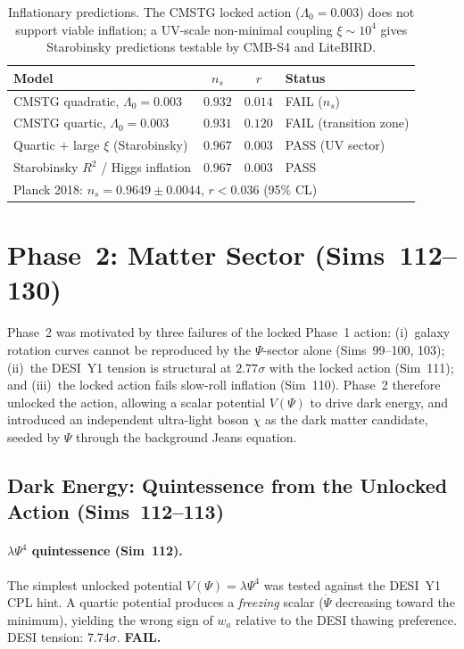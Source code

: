 \documentclass[12pt,a4paper]{article}
\begin{document}
\begin{table}[h]
\centering
\begin{tabular}{lccl}
\hline
Model & $n_s$ & $r$ & Status \\
\hline
CMSTG quadratic, $\Lambda_0=0.003$ & $0.932$ & $0.014$ & FAIL ($n_s$) \\
CMSTG quartic, $\Lambda_0=0.003$ & $0.931$ & $0.120$ & FAIL (transition zone) \\
Quartic $+$ large $\xi$ (Starobinsky) & $0.967$ & $0.003$ & PASS (UV sector) \\
Starobinsky $R^2$ / Higgs inflation & $0.967$ & $0.003$ & PASS \\
\hline
\multicolumn{4}{l}{Planck 2018: $n_s=0.9649\pm0.0044$, $r<0.036$ (95\% CL)} \\
\hline
\end{tabular}
\caption{Inflationary predictions. The CMSTG locked action ($\Lambda_0=0.003$)
does not support viable inflation; a UV-scale non-minimal coupling $\xi\sim10^4$
gives Starobinsky predictions testable by CMB-S4 and LiteBIRD.}
\label{tab:inflation}
\end{table}

\section{Phase~2: Matter Sector (Sims~112--130)}
\label{sec:phase2}

Phase~2 was motivated by three failures of the locked Phase~1 action:
(i)~galaxy rotation curves cannot be reproduced by the $\Psi$-sector alone
(Sims~99--100, 103); (ii)~the DESI~Y1 tension is structural at $2.77\sigma$
with the locked action (Sim~111); and (iii)~the locked action fails slow-roll
inflation (Sim~110).  Phase~2 therefore unlocked the action, allowing a scalar
potential $V(\Psi)$ to drive dark energy, and introduced an independent
ultra-light boson $\chi$ as the dark matter candidate, seeded by $\Psi$ through
the background Jeans equation.

\subsection{Dark Energy: Quintessence from the Unlocked Action (Sims~112--113)}

\paragraph{$\lambda\Psi^4$ quintessence (Sim~112).}
The simplest unlocked potential $V(\Psi)=\lambda\Psi^4$ was tested against the
DESI~Y1 CPL hint.  A quartic potential produces a \emph{freezing} scalar
($\dot\Psi$ decreasing toward the minimum), yielding the wrong sign of $w_a$
relative to the DESI thawing preference.  DESI tension: $7.74\sigma$.
\textbf{FAIL.}
\end{document}
